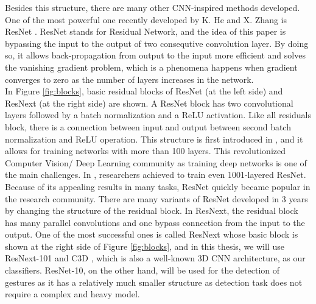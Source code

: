 Besides this structure, there are many other CNN-inspired methods developed.  One of the most powerful one recently developed by K. He and X. Zhang is ResNet \cite{he_deep_2015}. ResNet stands for Residual Network, and the idea of this paper is bypassing the input to the output of two consequtive convolution layer.  By doing so, it allows back-propagation from output to the input more efficient and solves the vanishing gradient problem, which is a phenomena happens when gradient converges to zero as the number of layers increases in the network.\\

In Figure \ref{fig:blocks}, basic residual blocks of ResNet (at the left side) and ResNext (at the right side) are shown. A ResNet block has two convolutional layers followed by a batch normalization and a ReLU activation.   Like all residuals block, there is a connection between input and output between second batch normalization and ReLU operation.    This structure is first introduced in \cite{he_deep_2015}, and it allows for training networks with more than 100 layers.    This revolutionized Computer   Vision/  Deep Learning community as training deep networks is one of the main challenges. In \cite{he_identity_2016}, researchers achieved to train even 1001-layered ResNet.   Because of its appealing results in many tasks, ResNet quickly became popular in the research community.  There are many variants of ResNet developed in  3 years by changing the structure of the residual block.  In ResNext, the residual block has many parallel convolutions and one bypass connection from the input to the output.  One of the most successful ones is called ResNext whose basic block is shown at the right side of Figure \ref{fig:blocks}, and in this thesis, we will use ResNext-101 \cite{xie_aggregated_2016} and C3D \cite{tran_learning_2014}, which is also a well-known 3D CNN architecture,  as our classifiers. ResNet-10, on the other hand,  will be used for the detection of gestures as it has a relatively much smaller structure as detection task does not require a complex and heavy model. \\


